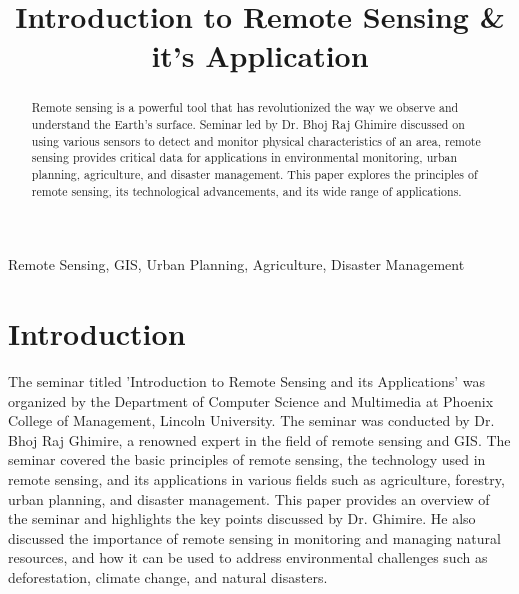\documentclass[conference]{IEEEtran}
\begin{document}
\title{Introduction to Remote Sensing \& it's Application}

\author{
}

\maketitle

\begin{abstract}
    Remote sensing is a powerful tool that has revolutionized the way we observe and understand the Earth's surface. Seminar led by Dr. Bhoj Raj Ghimire discussed on using various sensors to detect and monitor physical characteristics of an area, remote sensing provides critical data for applications in environmental monitoring, urban planning, agriculture, and disaster management. This paper explores the principles of remote sensing, its technological advancements, and its wide range of applications.
\end{abstract}

\begin{IEEEkeywords}
    Remote Sensing, GIS, Urban Planning, Agriculture, Disaster Management
\end{IEEEkeywords}

\section{Introduction}
The seminar titled 'Introduction to Remote Sensing and its Applications' was organized by the Department of Computer Science and Multimedia at Phoenix College of Management, Lincoln University. The seminar was conducted by Dr. Bhoj Raj Ghimire, a renowned expert in the field of remote sensing and GIS. The seminar covered the basic principles of remote sensing, the technology used in remote sensing, and its applications in various fields such as agriculture, forestry, urban planning, and disaster management. This paper provides an overview of the seminar and highlights the key points discussed by Dr. Ghimire. He also discussed the importance of remote sensing in monitoring and managing natural resources, and how it can be used to address environmental challenges such as deforestation, climate change, and natural disasters.
\end{document}
